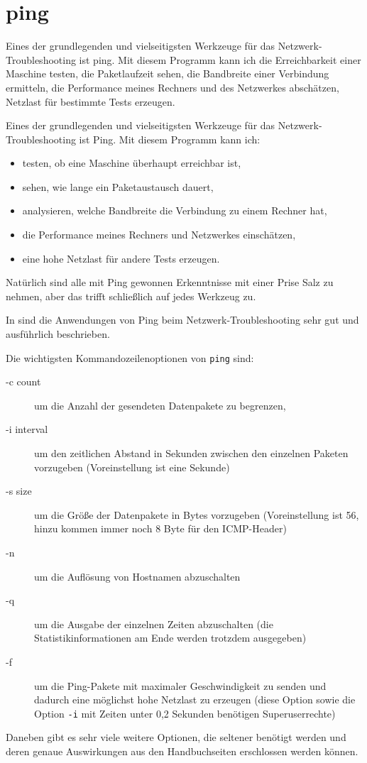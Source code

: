 \section{ping}
\label{sec:netz-werkzeuge-ping}
\begin{abstractsec}
  Eines der grundlegenden und vielseitigsten Werkzeuge für das
  Netzwerk-Troubleshooting ist ping. Mit diesem Programm kann ich die
  Erreichbarkeit einer Maschine testen, die Paketlaufzeit sehen, die
  Bandbreite einer Verbindung ermitteln, die Performance meines Rechners und
  des Netzwerkes abschätzen, Netzlast für bestimmte Tests erzeugen.
\end{abstractsec}
\begin{normaltext}
  Eines der grundlegenden und vielseitigsten Werkzeuge für das
  Netzwerk-Troubleshooting ist Ping. Mit diesem Programm kann ich:
  \begin{itemize}
    \item testen, ob eine Maschine überhaupt erreichbar ist,
    \item sehen, wie lange ein Paketaustausch dauert,
    \item analysieren, welche Bandbreite die Verbindung zu einem Rechner hat,
    \item die Performance meines Rechners und Netzwerkes einschätzen,
    \item eine hohe Netzlast für andere Tests erzeugen.
  \end{itemize}

  Natürlich sind alle mit Ping gewonnen Erkenntnisse mit einer Prise Salz zu
  nehmen, aber das trifft schließlich auf jedes Werkzeug zu.

  In \cite{sloan2001} sind die Anwendungen von Ping beim
  Netzwerk-Troubleshooting sehr gut und ausführlich beschrieben.

  Die wichtigsten Kommandozeilenoptionen von \verb?ping? sind:
  \begin{description}
    \item[-c count] um die Anzahl der gesendeten Datenpakete zu begrenzen,
    \item[-i interval] um den zeitlichen Abstand in Sekunden zwischen den
      einzelnen Paketen vorzugeben (Voreinstellung ist eine Sekunde)
    \item[-s size] um die Größe der Datenpakete in Bytes vorzugeben
      (Voreinstellung ist 56, hinzu kommen immer noch 8 Byte für den
      ICMP-Header)
    \item[-n] um die Auflösung von Hostnamen abzuschalten
    \item[-q] um die Ausgabe der einzelnen Zeiten abzuschalten (die
      Statistikinformationen am Ende werden trotzdem ausgegeben)
    \item[-f] um die Ping-Pakete mit maximaler Geschwindigkeit zu senden und
      dadurch eine möglichst hohe Netzlast zu erzeugen (diese Option sowie die
      Option \verb?-i? mit Zeiten unter 0,2 Sekunden benötigen
      Superuserrechte)
  \end{description}
  Daneben gibt es sehr viele weitere Optionen, die seltener benötigt werden
  und deren genaue Auswirkungen aus den Handbuchseiten erschlossen werden
  können.


\end{normaltext}

